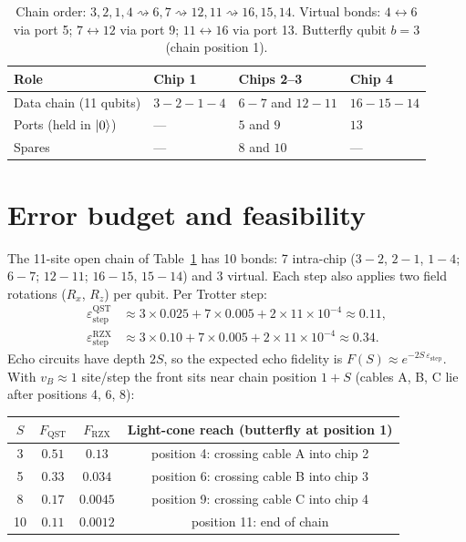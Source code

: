 \documentclass[11pt]{article}
\begin{document}
\begin{table}[h]
\centering
\begin{tabular}{llll}
\toprule
Role & Chip 1 & Chips 2--3 & Chip 4 \\
\midrule
Data chain (11 qubits) & $3\!-\!2\!-\!1\!-\!4$ & $6\!-\!7$ \;and\; $12\!-\!11$ & $16\!-\!15\!-\!14$ \\
Ports (held in $\ket{0}$) & --- & $5$ and $9$ & $13$ \\
Spares & --- & $8$ and $10$ & --- \\
\bottomrule
\end{tabular}
\caption{Chain order: $3,2,1,4 \rightsquigarrow 6,7 \rightsquigarrow 12,11
\rightsquigarrow 16,15,14$. Virtual bonds: $4\!\leftrightarrow\!6$ via port 5;
$7\!\leftrightarrow\!12$ via port 9; $11\!\leftrightarrow\!16$ via port 13.
Butterfly qubit $b=3$ (chain position 1).}
\label{tab:layout}
\end{table}

\section{Error budget and feasibility}
\label{sec:budget}

The 11-site open chain of Table~\ref{tab:layout} has 10 bonds: 7 intra-chip
($3\!-\!2$, $2\!-\!1$, $1\!-\!4$; $6\!-\!7$; $12\!-\!11$; $16\!-\!15$,
$15\!-\!14$) and 3 virtual. Each step also applies two field rotations
($R_x$, $R_z$) per qubit. Per Trotter step:
\begin{align}
  \varepsilon_{\mathrm{step}}^{\mathrm{QST}} &\approx
    3 \times 0.025 + 7 \times 0.005 + 2\times11\times 10^{-4} \approx 0.11, \\
  \varepsilon_{\mathrm{step}}^{\mathrm{RZX}} &\approx
    3 \times 0.10 + 7 \times 0.005 + 2\times11\times 10^{-4} \approx 0.34 .
\end{align}
Echo circuits have depth $2S$, so the expected echo fidelity is
$F(S)\approx e^{-2S\,\varepsilon_{\mathrm{step}}}$. With $v_B\approx1$
site/step the front sits near chain position $1+S$ (cables A, B, C lie after
positions 4, 6, 8):

\begin{center}
\begin{tabular}{cccc}
\toprule
$S$ & $F_{\mathrm{QST}}$ & $F_{\mathrm{RZX}}$ & Light-cone reach (butterfly at position 1) \\
\midrule
3  & $0.51$ & $0.13$   & position 4: crossing cable A into chip 2 \\
5  & $0.33$ & $0.034$  & position 6: crossing cable B into chip 3 \\
8  & $0.17$ & $0.0045$ & position 9: crossing cable C into chip 4 \\
10 & $0.11$ & $0.0012$ & position 11: end of chain \\
\bottomrule
\end{tabular}
\end{center}
\end{document}
